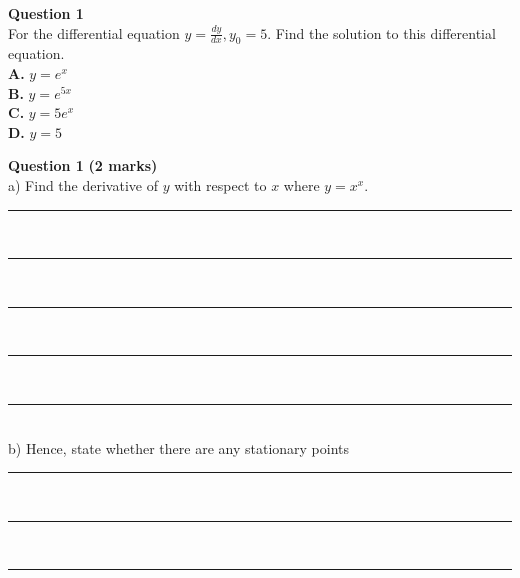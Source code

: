 \documentclass[a4paper,12pt]{article}
\begin{document}
\vspace{1cm}

\noindent \textbf{Question 1} \\[0.3cm]
For the differential equation \( y = \frac{dy}{dx}, y_0 = 5 \). Find the solution to this differential equation. \\[0.3cm]

\noindent \textbf{A.} \( y = e^x \) \\[0.3cm]
\textbf{B.} \( y = e^{5x} \) \\[0.3cm]
\textbf{C.} \( y = 5e^x \) \\[0.3cm]
\textbf{D.} \( y = 5 \)



\newpage
\begin{center}
    \setlength{\fboxsep}{10pt} %
\end{center}


\noindent \textbf{Question 1} \hfill \textbf{(2 marks)} \\[0.3cm]
a) Find the derivative of \( y \) with respect to \( x \) where \( y = x^x \). \hfill {} \\[1cm]
\rule{\textwidth}{0.5pt} \\[0.7cm]
\rule{\textwidth}{0.5pt} \\[0.7cm]
\rule{\textwidth}{0.5pt} \\[0.7cm]
\rule{\textwidth}{0.5pt} \\[0.7cm]
\rule{\textwidth}{0.5pt} \\[2cm]
b) Hence, state whether there are any stationary points \hfill {} \\[1cm]
\rule{\textwidth}{0.5pt} \\[0.7cm]
\rule{\textwidth}{0.5pt} \\[0.7cm]
\rule{\textwidth}{0.5pt} \\[2cm]
\end{document}
